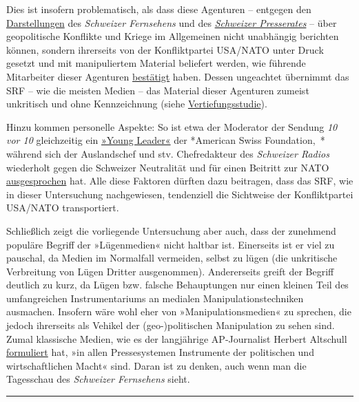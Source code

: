 Dies ist insofern problematisch, als dass diese Agenturen -- entgegen
den
\href{http://www.srf.ch/sendungen/hallosrf/warum-berichtet-srf-nicht-ueber-den-friedensmarsch-in-der-ukraine}{Darstellungen}
des \emph{Schweizer Fernsehens} und des
\emph{\href{https://swprs.org/schweizer-presserat-propaganda/}{Schweizer
Presserates}} -- über geopolitische Konflikte und Kriege im Allgemeinen
nicht unabhängig berichten können, sondern ihrerseits von der
Konfliktpartei USA/NATO unter Druck gesetzt und mit manipuliertem
Material beliefert werden, wie führende Mitarbeiter dieser Agenturen
\href{https://swprs.org/der-propaganda-multiplikator/}{bestätigt} haben.
Dessen ungeachtet übernimmt das SRF -- wie die meisten Medien -- das
Material dieser Agenturen zumeist unkritisch und ohne Kennzeichnung
(siehe
\href{https://swprs.org/der-propaganda-multiplikator/}{Vertiefungsstudie}).

Hinzu kommen personelle Aspekte: So ist etwa der Moderator der Sendung
\emph{10 vor 10} gleichzeitig ein
\href{http://www.americanswiss.org/news/arthur-honegger-spotlight/}{»Young
Leader«} der *American Swiss Foundation,~* während sich der Auslandschef
und stv. Chefredakteur des \emph{Schweizer Radios} wiederholt gegen die
Schweizer Neutralität und für einen Beitritt zur NATO
\href{https://swprs.org/2017/03/01/der-korrespondent/}{ausgesprochen}
hat. Alle diese Faktoren dürften dazu beitragen, dass das SRF, wie in
dieser Untersuchung nachgewiesen, tendenziell die Sichtweise der
Konfliktpartei USA/NATO transportiert.

Schließlich zeigt die vorliegende Untersuchung aber auch, dass der
zunehmend populäre Begriff der »Lügenmedien« nicht haltbar ist.
Einerseits ist er viel zu pauschal, da Medien im Normalfall vermeiden,
selbst zu lügen (die unkritische Verbreitung von Lügen Dritter
ausgenommen). Andererseits greift der Begriff deutlich zu kurz, da Lügen
bzw. falsche Behauptungen nur einen kleinen Teil des umfangreichen
Instrumentariums an medialen Manipulationstechniken ausmachen. Insofern
wäre wohl eher von »Manipulations­medien« zu sprechen, die jedoch
ihrerseits als Vehikel der (geo-)po­li­tischen Manipulation zu sehen
sind. Zumal klassische Medien, wie es der langjährige AP-Journalist
Herbert Altschull
\href{https://swprs.org/der-propaganda-multiplikator/}{formuliert} hat,
»in allen Pressesystemen Instrumente der politischen und
wirtschaft­lichen Macht« sind. Daran ist zu denken, auch wenn man die
Tagesschau des \emph{Schweizer Fernsehens} sieht.

\begin{center}\rule{0.5\linewidth}{\linethickness}\end{center}

